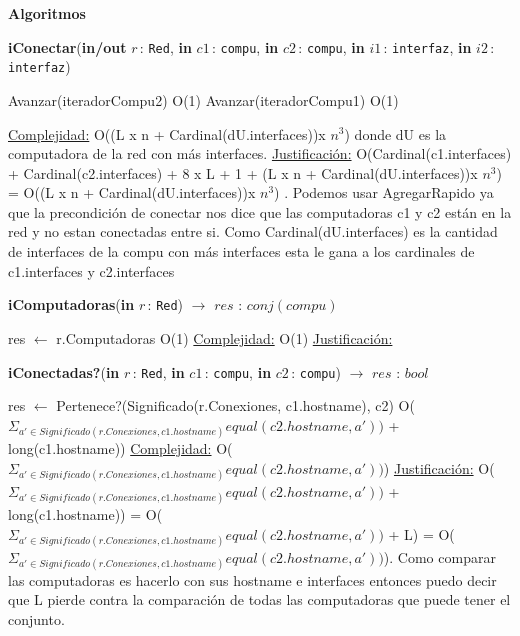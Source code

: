 \documentclass[a4paper,10pt]{article}
\let\TipoVariable=\texttt
\let\ModificadorArgumento=\textbf
\newcommand{\In}[2]{\ModificadorArgumento{in} \ensuremath{#1}\,: \TipoVariable{#2}\xspace}
\newcommand{\Inout}[2]{\ModificadorArgumento{in/out} \ensuremath{#1}\,: \TipoVariable{#2}\xspace}
\newenvironment{Algoritmos}{%
  \vspace*{2ex}%
  \noindent\textbf{\Large Algoritmos}%
  \vspace*{2ex}%
}{}
\begin{document}
\begin{Algoritmos}
\begin{algorithm}[H]{\textbf{iConectar}(\Inout {r}{Red}, \In {c1}{compu}, \In {c2}{compu}, \In {i1}{interfaz}, \In {i2}{interfaz})}
\begin{algorithmic}
			    \State Avanzar(iteradorCompu2) 	\Comment O(1)
			  \EndWhile
			  \State Avanzar(iteradorCompu1) 	\Comment O(1)
			\EndWhile
			
			
			\medskip
			\Statex \underline{Complejidad:} O((L x n + Cardinal(dU.interfaces))x $n^{3}$) donde dU es la computadora de la red con m\'as interfaces.
			\Statex \underline{Justificación:} O(Cardinal(c1.interfaces) + Cardinal(c2.interfaces) + 8 x L + 1 + (L x n + Cardinal(dU.interfaces))x $n^{3}$) = O((L x n + Cardinal(dU.interfaces))x $n^{3}$) . Podemos usar AgregarRapido ya que la precondici\'on de conectar nos dice que las computadoras c1 y c2 est\'an en la red y no estan conectadas entre si. Como Cardinal(dU.interfaces) es la cantidad de interfaces de la compu con m\'as interfaces esta le gana a los cardinales de c1.interfaces y c2.interfaces
    	\end{algorithmic}
\end{algorithm}



\begin{algorithm}[H]{\textbf{iComputadoras}(\In {r}{Red}) $\to$ $res$ : $conj(compu)$} 
	\begin{algorithmic}
			\State res $\gets$ r.Computadoras  		   \Comment O(1)
			\medskip
			\Statex \underline{Complejidad:} O(1)
			\Statex \underline{Justificación:} 
    	\end{algorithmic}
\end{algorithm}

\begin{algorithm}[H]{\textbf{iConectadas?}(\In {r}{Red}, \In {c1}{compu}, \In {c2}{compu}) $\to$ $res$ : $bool$} 
	\begin{algorithmic}
			\State res $\gets$ Pertenece?(Significado(r.Conexiones, c1.hostname), c2)   \Comment O($\Sigma_{a' \in Significado(r.Conexiones, c1.hostname)} equal(c2.hostname,a'))$ + long(c1.hostname))
			\medskip
			\Statex \underline{Complejidad:} O($\Sigma_{a' \in Significado(r.Conexiones, c1.hostname)} equal(c2.hostname,a'))$)
			\Statex \underline{Justificación:} O($\Sigma_{a' \in Significado(r.Conexiones, c1.hostname)} equal(c2.hostname,a'))$ + long(c1.hostname)) = O($\Sigma_{a' \in Significado(r.Conexiones, c1.hostname)} equal(c2.hostname,a'))$ + L) = O($\Sigma_{a' \in Significado(r.Conexiones, c1.hostname)} equal(c2.hostname,a'))$). Como comparar las computadoras es hacerlo con sus hostname e interfaces entonces puedo decir que L pierde contra la comparaci\'on de todas las computadoras que puede tener el conjunto. 
    	\end{algorithmic}
\end{algorithm}


\end{Algoritmos}
\end{document}
